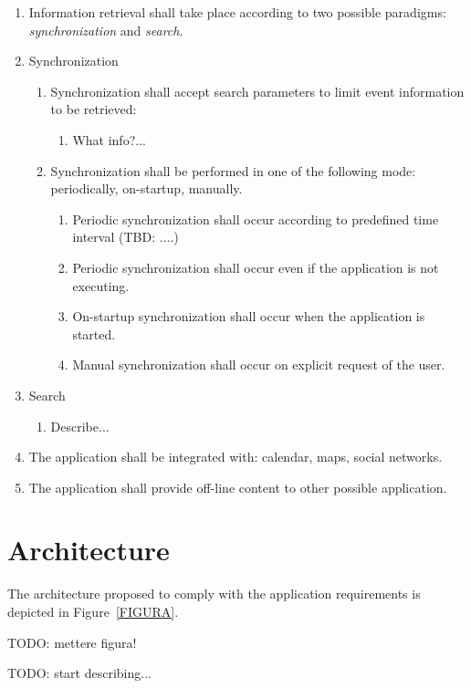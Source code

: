 \documentclass[10pt, twoside]{article}
\begin{document}
\begin{enumerate}
\begin{enumerate}
    \end{enumerate}
    \item Information retrieval shall take place according to two possible 
          paradigms: \emph{synchronization} and \emph{search}.
    \item Synchronization
    \begin{enumerate}
        \item Synchronization shall accept search parameters to limit
              event information to be retrieved:
        \begin{enumerate}
            \item What info?...
        \end{enumerate}
        \item Synchronization shall be performed in one of the following mode:
              periodically, on-startup, manually.
        \begin{enumerate}
            \item Periodic synchronization shall occur according 
                  to predefined time interval (TBD: ....)
            \item Periodic synchronization shall occur even if the application
                  is not executing.
            \item On-startup synchronization shall occur when the application is
                  started.
            \item Manual synchronization shall occur on explicit request of the
                  user.
        \end{enumerate}
    \end{enumerate}
    \item Search
    \begin{enumerate}
        \item Describe...
    \end{enumerate}
    \item The application shall be integrated with: calendar, maps, social
          networks.
    \item The application shall provide off-line content to other possible
          application.
\end{enumerate}

\section{Architecture}
The architecture proposed to comply with the application requirements
is depicted in Figure~\ref{FIGURA}. 

TODO: mettere figura!


TODO: start describing...
\end{document}
